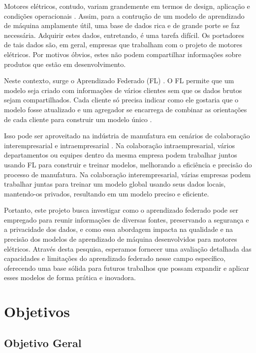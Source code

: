 \documentclass{article}
\begin{document}
Motores elétricos, contudo, variam grandemente em termos de design, aplicação e condições operacionais \cite{silva2018multiple,ibrahim2021surrogate}. Assim, para a contrução de um modelo de aprendizado de máquina amplamente útil, uma base de dados rica e de grande porte se faz necessária. Adquirir estes dados, entretando, é uma tarefa difícil. Os portadores de tais dados são, em geral, empresas que trabalham com o projeto de motores elétricos. Por motivos óbvios, estes não podem compartilhar informações sobre produtos que estão em desenvolvimento.

Neste contexto, surge o Aprendizado Federado (FL) \cite{ZHANG2021survey}. O FL permite que um modelo seja criado com informações de vários clientes sem que os dados brutos sejam compartilhados. Cada cliente só precisa indicar como ele gostaria que o modelo fosse atualizado e um agregador se encarrega de combinar as orientações de cada cliente para construir um modelo único \cite{ZHANG2021survey,ye2023heterogeneous}. 

Isso pode ser aproveitado na indústria de manufatura em cenários de colaboração interempresarial e intraempresarial \cite{islam2023applications}. Na colaboração intraempresarial, vários departamentos ou equipes dentro da mesma empresa podem trabalhar juntos usando FL para construir e treinar modelos, melhorando a eficiência e precisão do processo de manufatura. Na colaboração interempresarial, várias empresas podem trabalhar juntas para treinar um modelo global usando seus dados locais, mantendo-os privados, resultando em um modelo preciso e eficiente.

Portanto, este projeto busca investigar como o aprendizado federado pode ser empregado para reunir informações de diversas fontes, preservando a segurança e a privacidade dos dados, e como essa abordagem impacta na qualidade e na precisão dos modelos de aprendizado de máquina desenvolvidos para motores elétricos. Através desta pesquisa, esperamos fornecer uma avaliação detalhada das capacidades e limitações do aprendizado federado nesse campo específico, oferecendo uma base sólida para futuros trabalhos que possam expandir e aplicar esses modelos de forma prática e inovadora.
   
\section{Objetivos}

\subsection{Objetivo Geral}
\end{document}
